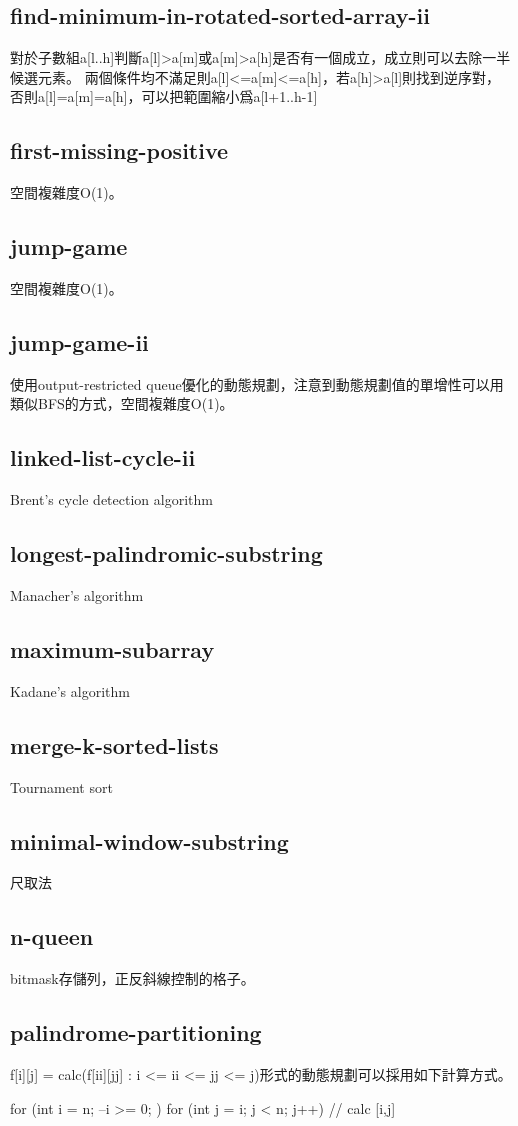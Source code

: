 \subsection{find-minimum-in-rotated-sorted-array-ii}
對於子數組a[l..h]判斷a[l]>a[m]或a[m]>a[h]是否有一個成立，成立則可以去除一半候選元素。 兩個條件均不滿足則a[l]<=a[m]<=a[h]，若a[h]>a[l]則找到逆序對，否則a[l]=a[m]=a[h]，可以把範圍縮小爲a[l+1..h-1]
\subsection{first-missing-positive}
空間複雜度O(1)。
\subsection{jump-game}
空間複雜度O(1)。
\subsection{jump-game-ii}
使用output-restricted queue優化的動態規劃，注意到動態規劃值的單增性可以用類似BFS的方式，空間複雜度O(1)。
\subsection{linked-list-cycle-ii}
Brent's cycle detection algorithm
\subsection{longest-palindromic-substring}
Manacher's algorithm
\subsection{maximum-subarray}
Kadane's algorithm
\subsection{merge-k-sorted-lists}
Tournament sort
\subsection{minimal-window-substring}
尺取法
\subsection{n-queen}
bitmask存儲列，正反斜線控制的格子。
\subsection{palindrome-partitioning}
f[i][j] = calc(f[ii][jj] : i <= ii <= jj <= j)形式的動態規劃可以採用如下計算方式。
\begin{Code}
	for (int i = n; --i >= 0; )
	for (int j = i; j < n; j++) {
		// calc [i,j]
	}
\end{Code}

